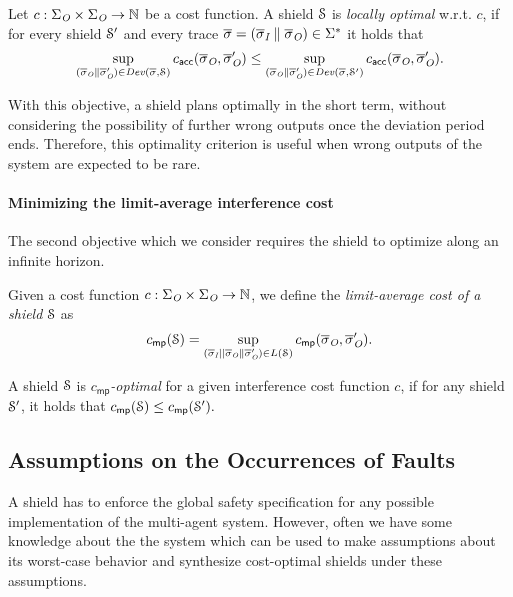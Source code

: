 \begin{defn}\label{def:locally-optimal}
Let $c : \Sigma_{\textit{O}} \times \Sigma_{\textit{O}} \to \mathbb{N}$ be a cost function. A shield $\mathcal{S}$ is \emph{locally optimal} w.r.t. $c$, if for every shield $\mathcal{S}'$ and every trace $\overline\sigma=(\overline\sigma_{\textit{I}}\parallel\overline\sigma_{\textit{O}})\in \Sigma^*$ it holds that
$$\sup_{(\overline\sigma_{\textit{O}}\parallel\overline\sigma_{\textit{O}}')\in\mathit{Dev}(\overline\sigma,\mathcal{S})} c_{\mathsf{acc}}(\overline\sigma_{\textit{O}},\overline\sigma_{\textit{O}}') \leq \sup_{(\overline\sigma_{\textit{O}}\parallel\overline\sigma_{\textit{O}}')\in\mathit{Dev}(\overline\sigma,\mathcal{S}')} c_{\mathsf{acc}}(\overline\sigma_{\textit{O}},\overline\sigma_{\textit{O}}').$$
\end{defn}
With this objective, a shield plans optimally in the short term, without considering the possibility of further wrong outputs once the deviation period ends. Therefore, this optimality criterion is useful when wrong outputs of the system are expected to be rare.

\iftrue
\paragraph*{Minimizing the limit-average interference cost}
The second objective which we consider requires the shield to optimize along an infinite horizon.

\begin{defn}\label{def:mp-optimal}
Given a cost function $c : \Sigma_{\textit{O}} \times \Sigma_{\textit{O}} \to \mathbb{N}$, we define the \emph{limit-average cost of a shield} $\mathcal{S}$ as$$c_{\mathsf{mp}}(\mathcal{S}) = \sup_{(\overline\sigma_{\textit{I}} || \overline\sigma_{\textit{O}}\parallel\overline\sigma_{\textit{O}}') \in L( \mathcal{S})}c_{\mathsf{mp}}(\overline\sigma_{\textit{O}},\overline\sigma_{\textit{O}}').$$
\end{defn}
\begin{defn}
A shield $\mathcal{S}$ is \emph{$c_{\mathsf{mp}}$-optimal} for a given interference cost function $c$, if for any shield $\mathcal{S}'$, it holds that
$c_{\mathsf{mp}}(\mathcal{S}) \leq c_{\mathsf{mp}}(\mathcal{S}').$
\end{defn}
\fi


\subsection{Assumptions on the Occurrences of Faults}\label{sec_assumptions}

A shield has to enforce the global safety specification for any possible  implementation of the multi-agent system.
However, often we have some knowledge about the the system which
can be used to make assumptions about its worst-case behavior and synthesize
cost-optimal shields under these assumptions.

